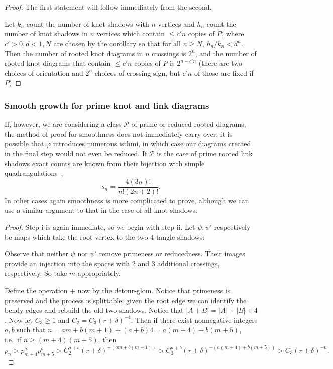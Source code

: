 \documentclass[amsmath,longbibliography,secnumarabic,floatfix,amssymb,nofootinbib,nobibnotes,letterpaper,11pt,notitlepage,tightenlines]{revtex4-1}
\newcommand{\PrimeShad}{\mathscr{P}}
\newcommand{\Shad}[1]{\tilde{#1}}
\begin{document}
\begin{proof}
  The first statement will follow immediately from the second.

  Let $k_n$ count the number of knot shadows with $n$ vertices and
  $h_n$ count the number of knot shadows in $n$ vertices which contain
  $\le c'n$ copies of $\Shad{P}$, where $c' > 0, d < 1, N$ are chosen
  by the corollary so that for all $n \ge N$, $h_n/k_n < d^n$. Then
  the number of rooted knot diagrams in $n$ crossings is $2^{n}$,
  and the number of rooted knot diagrams that contain $\le c'n$
  copies of $P$ is $2^{n-c'n}$ (there are two choices of orientation
  and $2^n$ choices of crossing sign, but $c'n$ of those are fixed if
  $P$)
\end{proof}

\subsubsection{Smooth growth for prime knot and link diagrams}
\label{sec:smoothprime}

If, however, we are considering a class $\PrimeShad$ of prime or reduced rooted diagrams, the method
of proof for smoothness does not immediately carry over; it is possible that $\varphi$ introduces
numerous isthmi, in which case our diagrams created in the final step would not even be reduced. If
$\PrimeShad$ is the case of prime rooted link shadows exact counts are known from their bijection
with simple quadrangulations~\cite{AlbenqueSQT};
\[ s_n = \frac{4(3n)!}{n!(2n + 2)!}.\]
In other cases again smoothness is more complicated to prove, although we can use a similar argument
to that in the case of all knot shadows.

\begin{proof}
  Step i is again immediate, so we begin with step ii. Let $\psi, \psi'$ respectively be maps which
  take the root vertex to the two 4-tangle shadows:

  Observe that neither $\psi$ nor $\psi'$ remove primeness or reducedness. Their images provide an
  injection into the spaces with 2 and 3 additional crossings, respectively. So take $m$
  appropriately.

  Define the operation $+$ now by the detour-glom. Notice that primeness is preserved and the
  process is splittable; given the root edge we can identify the bendy edges and rebuild the old two
  shadows. Notice that $|A + B| = |A| + |B| + 4$. Now let $C_3 \ge 1$ and $C_2 = C_3(r +
  \delta)^{-4}$. Then if there exist nonnegative integers $a, b$ such that $n = am + b(m+1) + (a+b)4
  = a(m + 4) + b(m+5)$, i.e.\ if $n \ge (m+4)(m+5)$, then
  \[ p_n > p_{m+4}^ap_{m+5}^b > C_2^{a+b}(r+\delta)^{-(am+b(m+1))} > C_3^{a+b}(r+\delta)^{-(a(m+4) + b(m+5))}
  > C_3(r+\delta)^{-n}.\]
\end{proof}
\end{document}
